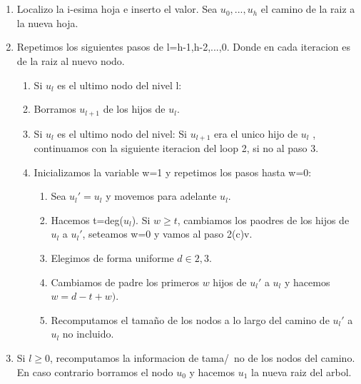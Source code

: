 \documentclass[10pt]{beamer}
\begin{document}

\section{}
\begin{frame}
\frametitle{}
\small
\begin{enumerate}\itemsep0em
  \item Localizo la i-esima hoja e inserto el valor. Sea $u_0,...,u_h$ el camino
    de la raiz a la nueva hoja.
  \item Repetimos los siguientes pasos de l=h-1,h-2,...,0. Donde en cada iteracion
    es de la raiz al nuevo nodo.
    \vspace{-0.05cm}
    \begin{enumerate}[a]\itemsep0em
      \item Si $u_l$ es el ultimo nodo del nivel l:
        \vspace{-0.05cm}
      \item Borramos $u_{l+1}$ de los hijos de $u_l$.
      \item Si $u_l$ es el ultimo nodo del nivel: Si $u_{l+1}$ era el unico hijo de $u_l$
      , continuamos con la siguiente iteracion del loop 2, si no al paso 3.
      \item Inicializamos la variable w=1 y repetimos los pasos hasta w=0:
        \vspace{-0.05cm}
        \begin{enumerate}[i]\itemsep0em
          \item Sea $u_l'=u_l$ y movemos para adelante $u_l$.
          \item Hacemos t=deg($u_l$). Si $w\geq t$, cambiamos los paodres de los hijos de $u_l$
            a $u_l'$, seteamos w=0 y vamos al paso 2(c)v.
          \item Elegimos de forma uniforme $d\in{2,3}$.
          \item Cambiamos de padre los primeros $w$ hijos de $u_l'$ a $u_l$ y hacemos $w=d-t+w)$.
          \item Recomputamos el tama\~no de los nodos a lo largo del camino de $u_l'$ a $u_l$ no incluido.
        \end{enumerate}
    \end{enumerate}
  \item Si $l\geq$0, recomputamos la informacion de tama/~no de los nodos del camino.
    En caso contrario borramos el nodo $u_0$ y hacemos $u_1$ la nueva raiz del arbol.
\end{enumerate}

\end{frame}
\end{document}
